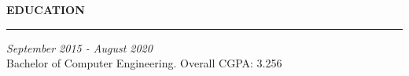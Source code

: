 \noindent\textcolor{themecolor}{\textbf{EDUCATION}}

\vspace{2mm}
\hrule
\vspace{3mm}
 \hfill {\em September 2015 - August 2020} 
\\ Bachelor of Computer Engineering.\hfill { Overall CGPA: 3.256 }


